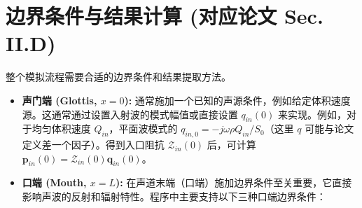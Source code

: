 \documentclass{ctexart}
\begin{document}
\section{边界条件与结果计算 (对应论文 Sec. II.D)}
整个模拟流程需要合适的边界条件和结果提取方法。
\begin{itemize}
    \item \textbf{声门端 (Glottis, $x=0$):} 通常施加一个已知的声源条件，例如给定体积速度源。这通常通过设置入射波的模式幅值或直接设置 $q_{in}(0)$ 来实现。例如，对于均匀体积速度 $Q_{in}$，平面波模式的 $q_{in, 0} = -j\omega\rho Q_{in} / S_0$（这里 $q$ 可能与论文定义差一个因子）。得到入口阻抗 $\boldsymbol{\mathcal{Z}}_{in}(0)$ 后，可计算 $\mathbf{p}_{in}(0) = \boldsymbol{\mathcal{Z}}_{in}(0) \mathbf{q}_{in}(0)$。
    \item \textbf{口端 (Mouth, $x=L$):} 在声道末端（口端）施加边界条件至关重要，它直接影响声波的反射和辐射特性。程序中主要支持以下三种口端边界条件：


\end{itemize}
\end{document}
